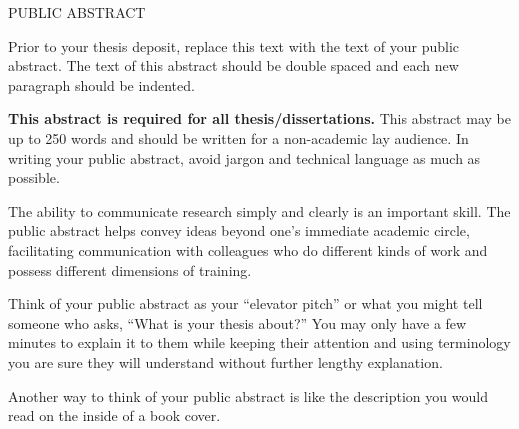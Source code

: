 \begin{doublespace}
\begin{tightcenter}
PUBLIC ABSTRACT
\mylinespacing
\end{tightcenter}

Prior to your thesis deposit, replace this text with the text of your public abstract.  The text of this abstract should be double spaced and each new paragraph should be indented.

\textbf{This abstract is required for all thesis/dissertations.}  This abstract may be up to 250 words and should be written for a non-academic lay audience.  In writing your public abstract, avoid jargon and technical language as much as possible. 

The ability to communicate research simply and clearly is an important skill. The public abstract helps convey ideas beyond one’s immediate academic circle, facilitating communication with colleagues who do different kinds of work and possess different dimensions of training.

Think of your public abstract as your “elevator pitch” or what you might tell someone who asks, “What is your thesis about?”  You may only have a few minutes to explain it to them while keeping their attention and using terminology you are sure they will understand without further lengthy explanation.    

Another way to think of your public abstract is like the description you would read on the inside of a book cover.

\end{doublespace}
